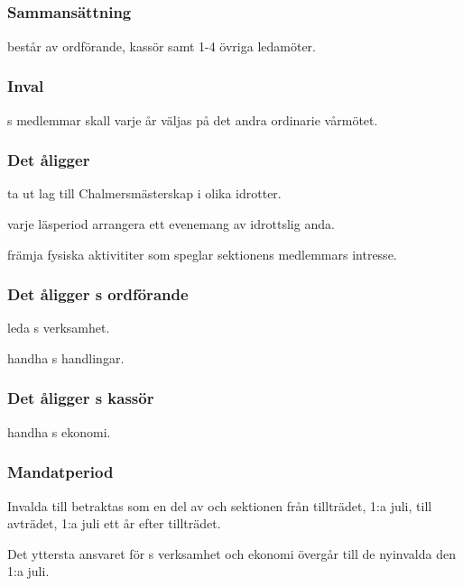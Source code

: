 \subsection{\FRITIDFULL}
\subsubsection{Sammansättning}
\FRITID{} består av ordförande, kassör samt 1-4 övriga ledamöter.

\subsubsection{Inval}
\FRITID{}s medlemmar skall varje år väljas på det andra ordinarie vårmötet.

\subsubsection{Det åligger \FRITID}
\begin{att}
	\item ta ut lag till Chalmersmästerskap i olika idrotter.
	\item varje läsperiod arrangera ett evenemang av idrottslig anda.
	\item främja fysiska aktivititer som speglar sektionens medlemmars intresse.
\end{att}

\subsubsection{Det åligger \FRITID{}s ordförande}
\begin{att}
	\item leda \FRITID{}s verksamhet.
	\item handha \FRITID{}s handlingar.
\end{att}

\subsubsection{Det åligger \FRITID{}s kassör}
\begin{att}
	\item handha \FRITID{}s ekonomi.
\end{att}

\subsubsection{Mandatperiod}
Invalda till \FRITID{} betraktas som en del av \FRITID{} och sektionen från tillträdet, 1:a juli, till avträdet, 1:a juli ett år efter tillträdet.

Det yttersta ansvaret för \FRITID{}s verksamhet och ekonomi övergår till de nyinvalda den 1:a juli.